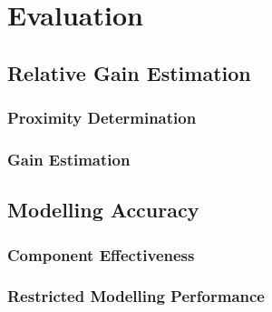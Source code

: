 \documentclass{UoYCSproject}
\begin{document}
	\chapter{Evaluation}
    \label{chap:eval}
    
	    \section{Relative Gain Estimation}
	    \label{sec:rgeaeval}
	    
		    \subsection{Proximity Determination}
		    
		    \subsection{Gain Estimation}
	    
	    \section{Modelling Accuracy}
	    \label{sec:modeleval}
	    
		    \subsection{Component Effectiveness}
		    
		    \subsection{Restricted Modelling Performance}
	
\end{document}
